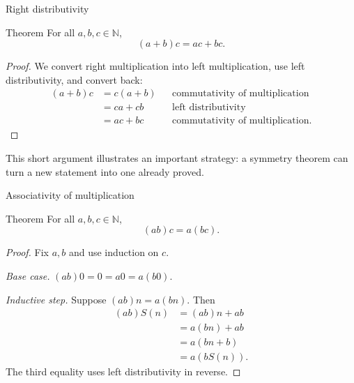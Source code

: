 \documentclass[aspectratio=169,11pt]{beamer}
\newcommand{\N}{\mathbb N}
\newcommand{\suc}[1]{S(#1)}
\begin{document}
\begin{frame}{Right distributivity}
  \begin{block}{Theorem}
    For all \(a,b,c\in\N\),
    \[
      (a+b)c=ac+bc.
    \]
  \end{block}

  \begin{proof}
    We convert right multiplication into left multiplication, use left
    distributivity, and convert back:
    \begin{align*}
      (a+b)c
        &=c(a+b) &&\text{commutativity of multiplication}\\
        &=ca+cb &&\text{left distributivity}\\
        &=ac+bc &&\text{commutativity of multiplication}.
    \end{align*}
  \end{proof}

  This short argument illustrates an important strategy: a symmetry theorem can
  turn a new statement into one already proved.
\end{frame}

\begin{frame}{Associativity of multiplication}
  \small
  \begin{block}{Theorem}
    For all \(a,b,c\in\N\),
    \[
      (ab)c=a(bc).
    \]
  \end{block}

  \begin{proof}
    Fix \(a,b\) and use induction on \(c\).

    \emph{Base case.}
    \((ab)0=0=a0=a(b0)\).

    \emph{Inductive step.} Suppose \((ab)n=a(bn)\).  Then
    \begin{align*}
      (ab)\suc n
        &=(ab)n+ab\\
        &=a(bn)+ab\\
        &=a(bn+b)\\
        &=a(b\suc n).
    \end{align*}
    The third equality uses left distributivity in reverse.
  \end{proof}
\end{frame}
\end{document}
